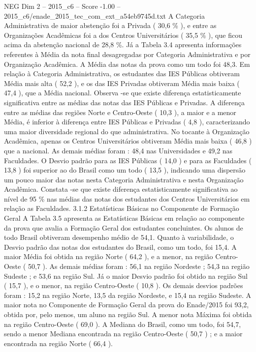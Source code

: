\begin{textsample}{NEG Dim 2 – 2015\_c6 – Score -1.00 – 2015\_c6/enade\_2015\_tec\_com\_ext\_a54eb9745d.txt}
A Categoria Administrativa de maior abstenção foi a Privada ( 30,6 \% ), e entre as Organizações Acadêmicas foi a dos Centros Universitários ( 35,5 \% ), que ficou acima da abstenção nacional de 28,8 \%.
Já a Tabela 3.4 apresenta informações referentes à Média da nota final desagregadas por Categoria Administrativa e por Organização Acadêmica.
A Média das notas da prova como um todo foi 48,3.
Em relação à Categoria Administrativa, os estudantes das IES Públicas obtiveram Média mais alta ( 52,2 ), e os das IES Privadas obtiveram Média mais baixa ( 47,4 ), que a Média nacional.
Observa -se que existe diferença estatisticamente significativa entre as médias das notas das IES Públicas e Privadas.
A diferença entre as médias das regiões Norte e Centro-Oeste ( 10,3 ), a maior e a menor Média, é inferior à diferença entre IES Públicas e Privadas ( 4,8 ), caracterizando uma maior diversidade regional do que administrativa.
No tocante à Organização Acadêmica, apenas os Centros Universitários obtiveram Média mais baixa ( 46,8 ) que a nacional.
As demais médias foram : 48,4 nas Universidades e 49,2 nas Faculdades.
O Desvio padrão para as IES Públicas ( 14,0 ) e para as Faculdades ( 13,8 ) foi superior ao do Brasil como um todo ( 13,5 ), indicando uma dispersão um pouco maior das notas nesta Categoria Administrativa e nesta Organização Acadêmica.
Constata -se que existe diferença estatisticamente significativa ao nível de 95 \% nas médias das notas dos estudantes dos Centros Universitários em relação as Faculdades. 3.1.2 Estatísticas Básicas no Componente de Formação Geral A Tabela 3.5 apresenta as Estatísticas Básicas em relação ao componente da prova que avalia a Formação Geral dos estudantes concluintes.
Os alunos de todo Brasil obtiveram desempenho médio de 54,1.
Quanto à variabilidade, o Desvio padrão das notas dos estudantes do Brasil, como um todo, foi 15,4.
A maior Média foi obtida na região Norte ( 64,2 ), e a menor, na região Centro-Oeste ( 50,7 ).
As demais médias foram : 56,1 na região Nordeste ; 54,3 na região Sudeste ; e 53,6 na região Sul.
Já o maior Desvio padrão foi obtido na região Sul ( 15,7 ), e o menor, na região Centro-Oeste ( 10,8 ).
Os demais desvios padrões foram : 15,2 na região Norte, 13,5 da região Nordeste, e 15,4 na região Sudeste.
A maior nota no Componente de Formação Geral da prova do Enade/2015 foi 93,2, obtida por, pelo menos, um aluno na região Sul.
A menor nota Máxima foi obtida na região Centro-Oeste ( 69,0 ).
A Mediana do Brasil, como um todo, foi 54,7, sendo a menor Mediana encontrada na região Centro-Oeste ( 50,7 ) ; e a maior encontrada na região Norte ( 66,4 ).

\end{textsample}
